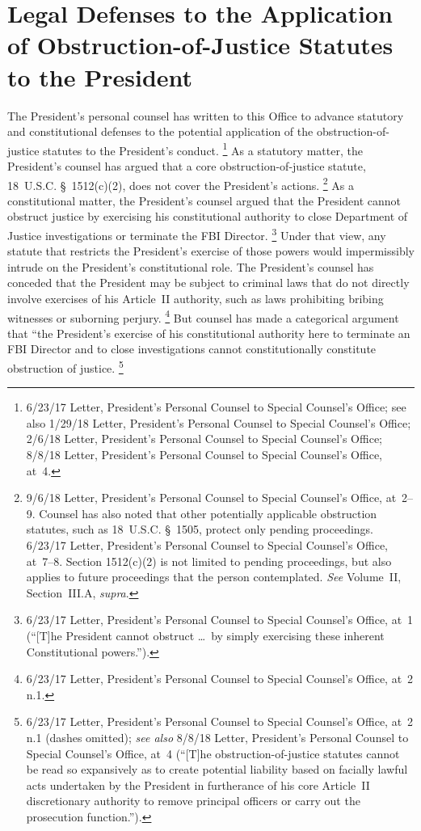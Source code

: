\section{Legal Defenses to the Application of Obstruction-of-Justice Statutes to the President}

The President's personal counsel has written to this Office to advance statutory and constitutional defenses to the potential application of the obstruction-of-justice statutes to the President's conduct.%
\footnote{6/23/17 Letter, President's Personal Counsel to Special Counsel's Office;
see also 1/29/18 Letter, President's Personal Counsel to Special Counsel's Office;
2/6/18 Letter, President's Personal Counsel to Special Counsel's Office;
8/8/18 Letter, President's Personal Counsel to Special Counsel's Office, at~4.}
As a statutory matter, the President's counsel has argued that a core obstruction-of-justice statute, 18~U.S.C. \S~1512(c)(2), does not cover the President's actions.%
\footnote{9/6/18 Letter, President's Personal Counsel to Special Counsel's Office, at~2--9.
Counsel has also noted that other potentially applicable obstruction statutes, such as 18~U.S.C. \S~1505, protect only pending proceedings.
6/23/17 Letter, President's Personal Counsel to Special Counsel's Office, at~7--8.
Section 1512(c)(2) is not limited to pending proceedings, but also applies to future proceedings that the person contemplated.
\textit{See} Volume~II, Section~III.A, \textit{supra}.}
As a constitutional matter, the President's counsel argued that the President cannot obstruct justice by exercising his constitutional authority to close Department of Justice investigations or terminate the FBI Director.%
\footnote{6/23/17 Letter, President's Personal Counsel to Special Counsel's Office, at~1 (``[T]he President cannot obstruct \dots\ by simply exercising these inherent Constitutional powers.'').}
Under that view, any statute that restricts the President's exercise of those powers would impermissibly intrude on the President's constitutional role.
The President's counsel has conceded that the President may be subject to criminal laws that do not directly involve exercises of his Article~II authority, such as laws prohibiting bribing witnesses or suborning perjury.%
\footnote{6/23/17 Letter, President's Personal Counsel to Special Counsel's Office, at~2 n.1.}
But counsel has made a categorical argument that ``the President's exercise of his constitutional authority here to terminate an FBI Director and to close investigations cannot constitutionally constitute obstruction of justice.%
\footnote{6/23/17 Letter, President's Personal Counsel to Special Counsel's Office, at~2 n.1 (dashes omitted);
\textit{see also} 8/8/18 Letter, President's Personal Counsel to Special Counsel's Office, at~4 (``[T]he obstruction-of-justice statutes cannot be read so expansively as to create potential liability based on facially lawful acts undertaken by the President in furtherance of his core Article~II discretionary authority to remove principal officers or carry out the prosecution function.'').}

